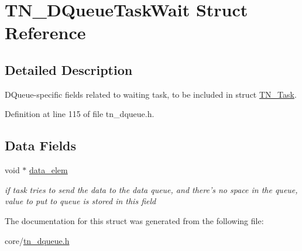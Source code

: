 \hypertarget{structTN__DQueueTaskWait}{\section{T\+N\+\_\+\+D\+Queue\+Task\+Wait Struct Reference}
\label{structTN__DQueueTaskWait}
}


\subsection{Detailed Description}
D\+Queue-\/specific fields related to waiting task, to be included in struct \hyperlink{structTN__Task}{T\+N\+\_\+\+Task}. 

Definition at line 115 of file tn\+\_\+dqueue.\+h.

\subsection*{Data Fields}
\begin{DoxyCompactItemize}
\item 
\hypertarget{structTN__DQueueTaskWait_aa3dd6acde9f906208285e539e7c1949d}{void $\ast$ \hyperlink{structTN__DQueueTaskWait_aa3dd6acde9f906208285e539e7c1949d}{data\+\_\+elem}}\label{structTN__DQueueTaskWait_aa3dd6acde9f906208285e539e7c1949d}

\begin{DoxyCompactList}\small\item\em if task tries to send the data to the data queue, and there's no space in the queue, value to put to queue is stored in this field \end{DoxyCompactList}\end{DoxyCompactItemize}


The documentation for this struct was generated from the following file\+:\begin{DoxyCompactItemize}
\item 
core/\hyperlink{tn__dqueue_8h}{tn\+\_\+dqueue.\+h}\end{DoxyCompactItemize}
